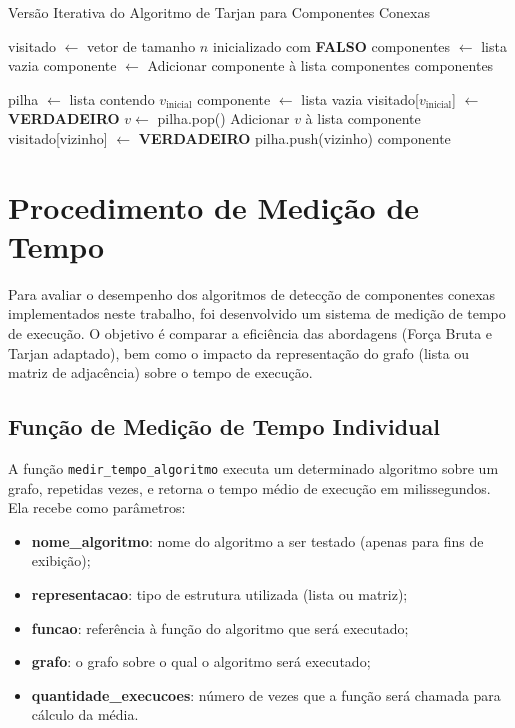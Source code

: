 \documentclass[12pt]{article}
\begin{document}
\begin{algorithm}[H]
\caption{Versão Iterativa do Algoritmo de Tarjan para Componentes Conexas}
\begin{algorithmic}[1]
    \State visitado $\gets$ vetor de tamanho $n$ inicializado com \textbf{FALSO}
    \State componentes $\gets$ lista vazia
            \State componente $\gets$ 
            \State Adicionar componente à lista componentes
        \EndIf
    \EndFor
    \State \Return componentes
\EndFunction

    \State pilha $\gets$ lista contendo $v_{\text{inicial}}$
    \State componente $\gets$ lista vazia
    \State visitado[$v_{\text{inicial}}$] $\gets$ \textbf{VERDADEIRO}
        \State $v \gets$ pilha.pop()
        \State Adicionar $v$ à lista componente
                \State visitado[vizinho] $\gets$ \textbf{VERDADEIRO}
                \State pilha.push(vizinho)
            \EndIf
        \EndFor
    \EndWhile
    \State \Return componente
\EndFunction
\end{algorithmic}
\end{algorithm}



\section{Procedimento de Medição de Tempo}

Para avaliar o desempenho dos algoritmos de detecção de componentes conexas implementados neste trabalho, foi desenvolvido um sistema de medição de tempo de execução. O objetivo é comparar a eficiência das abordagens (Força Bruta e Tarjan adaptado), bem como o impacto da representação do grafo (lista ou matriz de adjacência) sobre o tempo de execução.

\subsection{Função de Medição de Tempo Individual}

A função \texttt{medir\_tempo\_algoritmo} executa um determinado algoritmo sobre um grafo, repetidas vezes, e retorna o tempo médio de execução em milissegundos. Ela recebe como parâmetros:

\begin{itemize}
    \item \textbf{nome\_algoritmo}: nome do algoritmo a ser testado (apenas para fins de exibição);
    \item \textbf{representacao}: tipo de estrutura utilizada (lista ou matriz);
    \item \textbf{funcao}: referência à função do algoritmo que será executado;
    \item \textbf{grafo}: o grafo sobre o qual o algoritmo será executado;
    \item \textbf{quantidade\_execucoes}: número de vezes que a função será chamada para cálculo da média.
\end{itemize}
\end{document}
